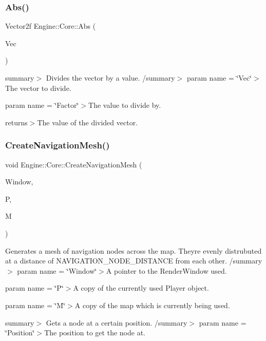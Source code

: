 \subsubsection{\texorpdfstring{Abs()}{Abs()}}
{\footnotesize\ttfamily Vector2f Engine\+::\+Core\+::\+Abs (\begin{DoxyParamCaption}\item[{Vector2f}]{Vec }\end{DoxyParamCaption})}

summary$>$ Divides the vector by a value. /summary$>$ param name = \char`\"{}\+Vec\char`\"{}$>$The vector to divide.

param name = \char`\"{}\+Factor\char`\"{}$>$The value to divide by.

returns$>$The value of the divided vector.\mbox{\label{namespace_engine_1_1_core_aed5870f781469ec1fcbb7b7114de91ff}} 
\subsubsection{\texorpdfstring{Create\+Navigation\+Mesh()}{CreateNavigationMesh()}}
{\footnotesize\ttfamily void Engine\+::\+Core\+::\+Create\+Navigation\+Mesh (\begin{DoxyParamCaption}\item[{Render\+Window $\ast$}]{Window,  }\item[{\hyperlink{class_engine_1_1_game_play_1_1_player}{Player}}]{P,  }\item[{\hyperlink{class_engine_1_1_core_1_1_map}{Map}}]{M }\end{DoxyParamCaption})}



Generates a mesh of navigation nodes across the map. They\textquotesingle{}re evenly distrubuted at a distance of N\+A\+V\+I\+G\+A\+T\+I\+O\+N\+\_\+\+N\+O\+D\+E\+\_\+\+D\+I\+S\+T\+A\+N\+CE from each other. /summary$>$ param name = \char`\"{}\+Window\char`\"{}$>$A pointer to the Render\+Window used.

param name = \char`\"{}\+P\char`\"{}$>$A copy of the currently used Player object.

param name = \char`\"{}\+M\char`\"{}$>$A copy of the map which is currently being used.

summary$>$ Gets a node at a certain position. /summary$>$ param name = \char`\"{}\+Position\char`\"{}$>$The position to get the node at.

